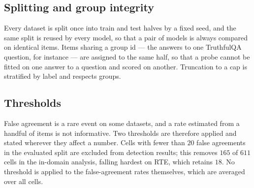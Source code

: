 \subsection{Splitting and group integrity}

Every dataset is split once into train and test halves by a fixed seed, and the
same split is reused by every model, so that a pair of models is always compared
on identical items. Items sharing a group id --- the answers to one TruthfulQA
question, for instance --- are assigned to the same half, so that a probe cannot
be fitted on one answer to a question and scored on another. Truncation to a
cap is stratified by label and respects groups.

\subsection{Thresholds}

False agreement is a rare event on some datasets, and a rate estimated from a
handful of items is not informative. Two thresholds are therefore applied and
stated wherever they affect a number. Cells with fewer than $20$ false
agreements in the evaluated split are excluded from detection results; this
removes $165$ of $611$ cells in the in-domain analysis, falling hardest on RTE,
which retains $18$. No threshold is applied to the false-agreement rates
themselves, which are averaged over all cells.
